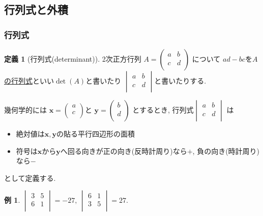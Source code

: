 \documentclass[dvipdfmx,a4paper,11pt]{article}
\theoremstyle{definition}
\newtheorem{dfn}[thm]{定義}
\newtheorem{exa}[thm]{例}
\begin{document}
\subsection{行列式と外積 \cite[1.3節]{M}}
\label{subsec-det-wedge}
\subsubsection{行列式}
\begin{tcolorbox}[
    colback = white,
    colframe = green!35!black,
    fonttitle = \bfseries,
    breakable = true]
    \begin{dfn}[行列式(determinant)]
2次正方行列
 $A=
  \begin{pmatrix}
 a& b  \\
 c& d  \\
 \end{pmatrix} 
 $
 について
  $ad-bc$を\underline{$A$の行列式}といい$\det(A)$と書いたり
  $  \begin{vmatrix}
 a& b  \\
 c& d  \\
 \end{vmatrix} $と書いたりする. 
    \end{dfn}

 \end{tcolorbox}
 
 幾何学的には
 $\bm{x}=
  \begin{pmatrix}
 a  \\
 c  \\
 \end{pmatrix} 
$と
$ \bm{y}=\begin{pmatrix}
b \\
 d  \\
 \end{pmatrix} 
 $
 とするとき, 行列式$  \begin{vmatrix}
 a& b  \\
 c& d  \\
 \end{vmatrix} $
 は
 \begin{itemize}
 	\setlength{\parskip}{0cm}
  	\setlength{\itemsep}{0pt}
\item 絶対値は$\bm{x}, \bm{y}$の貼る平行四辺形の面積
\item 符号は$\bm{x}$から$\bm{y}$へ回る向きが正の向き(反時計周り)なら$+$, 負の向き(時計周り)なら$-$ 
 \end{itemize}
 として定義する.


 \begin{exa}
$
\begin{vmatrix}
3&5\\
6&1 \\
\end{vmatrix}
=-27
\text{, } 
\begin{vmatrix}
6&1 \\
3&5\\
\end{vmatrix}
=
27.
 $
 \end{exa}
 
\end{document}
